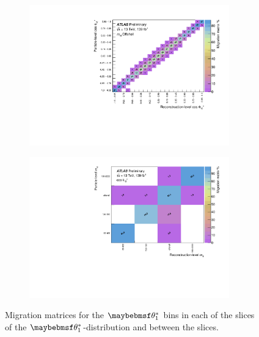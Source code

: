\begin{figure}[htb]
  \begin{subfigure}{.49\textwidth}\centering\includegraphics[width = 0.95\textwidth]{Figures/m4l/UnfoldingStudies/v014_matrices/cosThetaStar1_m4loffshellMatrix.pdf}\end{subfigure}
  \begin{subfigure}{.49\textwidth}\centering\includegraphics[width = 0.95\textwidth]{Figures/m4l/UnfoldingStudies/v014_matrices/cosThetaStar1_m4lMatrix.pdf}\end{subfigure}
\caption{Migration matrices for the $\thetastar_{1}$ bins in each of the \mFourL slices of the $\thetastar_{1}$-\mFourL distribution and between the slices.}
 \end{figure}



